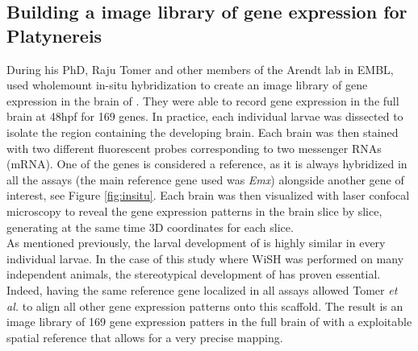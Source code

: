      \subsection{Building a image library of gene expression for Platynereis}
     During his PhD, Raju Tomer and other members of the Arendt lab in EMBL, used wholemount in-situ hybridization to create an image library of gene expression in the brain of \platy{}. They were able to record gene expression in the full brain at 48hpf for 169 genes. In practice, each individual larvae was dissected to isolate the region containing the developing brain. Each brain was then stained with two different fluorescent probes corresponding to two messenger RNAs (mRNA). One of the genes is considered a reference, as it is always hybridized in all the assays (the main reference gene used was \emph{Emx}) alongside another gene of interest, see Figure \ref{fig:insitu}. Each brain was then visualized with laser confocal microscopy to reveal the gene expression patterns in the brain slice by slice, generating at the same time 3D coordinates for each slice.\\
     
     As mentioned previously, the larval development of \platy{} is highly similar in every individual larvae. In the case of this study where WiSH was performed on many independent animals, the stereotypical development of \platy{} has proven essential. Indeed, having the same reference gene localized in all assays allowed Tomer \emph{et al.} to align all other gene expression patterns onto this scaffold. The result is an image library of 169 gene expression patters in the full brain of \platy{} with a exploitable spatial reference that allows for a very precise mapping.\\
    
